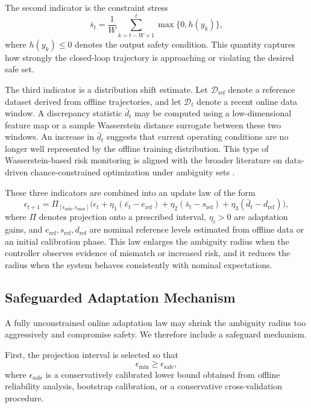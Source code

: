 \documentclass[conference]{IEEEtran}
\begin{document}
The second indicator is the constraint stress
\begin{equation}
\bar s_t = \frac{1}{W}\sum_{k=t-W+1}^{t} \max\{0, h(y_k)\},
\end{equation}
where $h(y_k) \le 0$ denotes the output safety condition. This quantity captures how strongly the closed-loop trajectory is approaching or violating the desired safe set.

The third indicator is a distribution shift estimate. Let $\mathcal{D}_{\mathrm{ref}}$ denote a reference dataset derived from offline trajectories, and let $\mathcal{D}_t$ denote a recent online data window. A discrepancy statistic $\bar d_t$ may be computed using a low-dimensional feature map or a sample Wasserstein distance surrogate between these two windows. An increase in $\bar d_t$ suggests that current operating conditions are no longer well represented by the offline training distribution. This type of Wasserstein-based risk monitoring is aligned with the broader literature on data-driven chance-constrained optimization under ambiguity sets \cite{HotaCherukuriLygeros2019}.

These three indicators are combined into an update law of the form
\begin{equation}
\epsilon_{t+1} = \Pi_{[\epsilon_{\min},\epsilon_{\max}]}\Big(
\epsilon_t + \eta_1(\bar e_t - e_{\mathrm{ref}})
+ \eta_2(\bar s_t - s_{\mathrm{ref}})
+ \eta_3(\bar d_t - d_{\mathrm{ref}})
\Big),
\end{equation}
where $\Pi$ denotes projection onto a prescribed interval, $\eta_i > 0$ are adaptation gains, and $e_{\mathrm{ref}}, s_{\mathrm{ref}}, d_{\mathrm{ref}}$ are nominal reference levels estimated from offline data or an initial calibration phase. This law enlarges the ambiguity radius when the controller observes evidence of mismatch or increased risk, and it reduces the radius when the system behaves consistently with nominal expectations.

\subsection{Safeguarded Adaptation Mechanism}
A fully unconstrained online adaptation law may shrink the ambiguity radius too aggressively and compromise safety. We therefore include a safeguard mechanism.

First, the projection interval is selected so that
\begin{equation}
\epsilon_{\min} \ge \epsilon_{\mathrm{safe}},
\end{equation}
where $\epsilon_{\mathrm{safe}}$ is a conservatively calibrated lower bound obtained from offline reliability analysis, bootstrap calibration, or a conservative cross-validation procedure.
\end{document}
